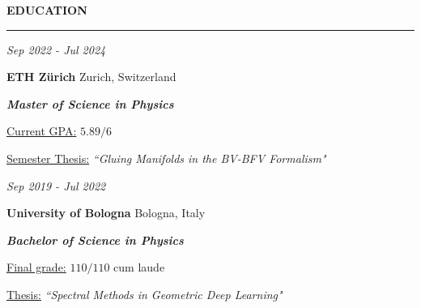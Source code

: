 \documentclass[a4paper, 11pt]{article}
\newcommand{\mycolor}{ETHRed}    %
\newcommand{\bluecircle}{\textcolor{\mycolor}{\textbullet}}
\newenvironment{indentitem}[1]{
    \begin{itemize}[itemsep = -4pt, topsep = -1pt, label=\bluecircle, leftmargin=1.2em]
        #1
}{
    \end{itemize}
}
\newcommand{\leftcolumwidth}{0.25}
\newcommand{\rightcolumwidth}{0.65}
\newcommand{\intersectionsep}{\vspace{2em}}
\newcommand{\intrasectionsep}{\vspace{0.6em}}
\newcommand{\sectionlinethickness}{2pt}
\newlength{\midl}
\newcommand{\cvsection}[1]{
    \setlength\topsep{0pt}%
    \begin{minipage}[c]{\leftcolumwidth\textwidth}%
        \raggedleft
        \textcolor{\mycolor}{\MakeUppercase{\bfseries \sffamily #1}}%
    \end{minipage}%
    \hspace{\midl}%
    \textcolor{\mycolor}{\noindent\rule[0em]{\rightcolumwidth\textwidth}{\sectionlinethickness}}%
    \vspace{-\baselineskip}%
    \intersectionsep%
}
\newcommand{\cvline}[2]{
    \setlength\topsep{0pt}%
    \begin{minipage}[t]{\leftcolumwidth\textwidth}%
        \raggedleft
        {#1}
    \end{minipage}%
    \hspace{\midl}%
    \begin{minipage}[c]{\rightcolumwidth\textwidth}
        {#2}
    \end{minipage}
}
\newcommand{\cventry}[3]{
    \cvline{#1}{#2}

    \cvline{\phantom{Void}}{#3}
}
\newcommand{\cventryright}[1]{
    \cvline{\phantom{Void}}{#1}
}
\newcommand{\cvpdf}[1]{
    \href{#1}{\textcolor{colorlink}{\faFilePdfO}}
}
\begin{document}
\cvsection{Education}

\cventry{\itshape Sep 2022 - Jul 2024}{
    {\bfseries \large ETH Zürich}
    \hfill
    {\upshape Zurich, Switzerland}}
    {\textcolor{colorsubtitle}{\slshape \bfseries Master of Science in Physics}}

\intrasectionsep
\cventryright{
    \underline{Current GPA:} {$5.89 / 6$}\cvpdf{https://drive.google.com/file/d/1huf4cmqlLs3cacg6CwknHLEUj6bHxvz2/view?usp=share_link}
}

\intrasectionsep
\cventryright{
    \underline{Semester Thesis:}
     \emph{“Gluing Manifolds in the BV-BFV Formalism"}%
}
\intersectionsep

\cventry{\itshape Sep 2019 - Jul 2022}{
    {\bfseries \large University of Bologna}
    \hfill
    {\upshape Bologna, Italy}}
    {\textcolor{colorsubtitle}{\slshape \bfseries Bachelor of Science in Physics}}

\intrasectionsep
\cventryright{
    \underline{Final grade:} {$110 / 110$ cum laude}\cvpdf{https://drive.google.com/file/d/1CEhzsCPFQEI_VTm2NJPYABiaq-3fuA9z/view?usp=share_link}
    \intrasectionsep

    \underline{Thesis:} \emph{“Spectral Methods in Geometric Deep Learning"}%
}
\intersectionsep
\end{document}
